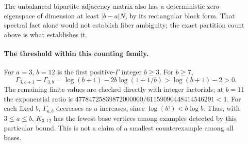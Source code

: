 \documentclass[11pt]{article}
\begin{document}
The unbalanced bipartite adjacency matrix also has a deterministic zero
eigenspace of dimension at least $|b-a|N$, by its rectangular block
form. That spectral fact alone would not establish fiber ambiguity;
the exact partition count above is what establishes it.

\paragraph{The threshold within this counting family.}
For $a=3$, $b=12$ is the first positive-$\Gamma$ integer $b\ge3$.
For $b\ge7$,
\[
 \Gamma_{3,b+1}-\Gamma_{3,b}
 =\log(b+1)-2b\log(1+1/b)>\log(b+1)-2>0.
\]
The remaining finite values are checked directly with integer
factorials; at $b=11$ the exponential ratio is
$47784725839872000000/61159090448414546291<1$.
For each fixed $b$, $\Gamma_{a,b}$ decreases as $a$ increases, since
$\log(b!)<b\log b$. Thus, with $3\le a\le b$, $K_{3,12}$ has the
fewest base vertices among examples detected by this particular bound.
This is not a claim of a smallest counterexample among all bases.
\end{document}
